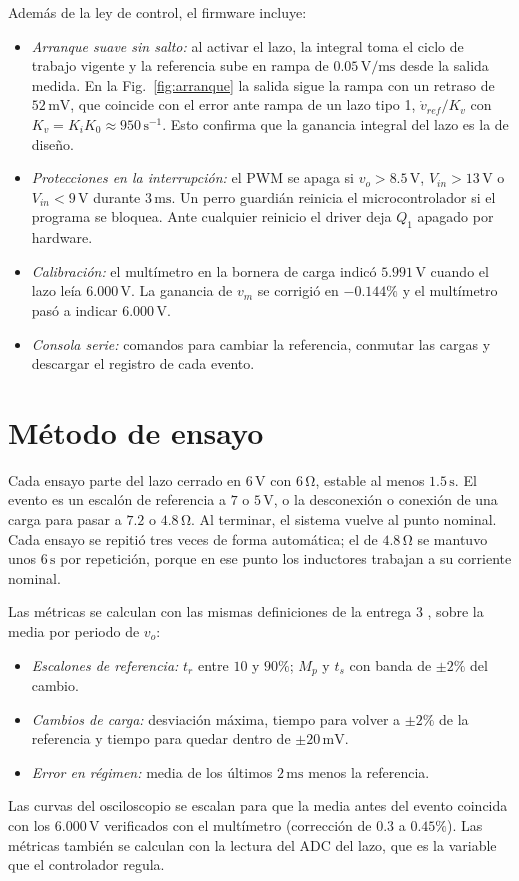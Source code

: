 \documentclass[conference,letterpaper]{IEEEtran}
\newcommand{\unit}[1]{\,\mathrm{#1}}
\begin{document}
Además de la ley de control, el firmware incluye:
\begin{itemize}
\item \emph{Arranque suave sin salto:} al activar el lazo, la integral toma el ciclo de trabajo vigente y la referencia sube en rampa de $0.05\unit{V/ms}$ desde la salida medida. En la Fig.~\ref{fig:arranque} la salida sigue la rampa con un retraso de $52\unit{mV}$, que coincide con el error ante rampa de un lazo tipo 1, $\dot v_{ref}/K_v$ con $K_v=K_iK_0\approx950\unit{s^{-1}}$. Esto confirma que la ganancia integral del lazo es la de diseño.
\item \emph{Protecciones en la interrupción:} el PWM se apaga si $v_o>8.5\unit{V}$, $V_{in}>13\unit{V}$ o $V_{in}<9\unit{V}$ durante $3\unit{ms}$. Un perro guardián reinicia el microcontrolador si el programa se bloquea. Ante cualquier reinicio el driver deja $Q_1$ apagado por hardware.
\item \emph{Calibración:} el multímetro en la bornera de carga indicó $5.991\unit{V}$ cuando el lazo leía $6.000\unit{V}$. La ganancia de $v_m$ se corrigió en $-0.144\%$ y el multímetro pasó a indicar $6.000\unit{V}$.
\item \emph{Consola serie:} comandos para cambiar la referencia, conmutar las cargas y descargar el registro de cada evento.
\end{itemize}

\section{Método de ensayo}\label{sec:metodo}
Cada ensayo parte del lazo cerrado en $6\unit{V}$ con $6\unit{\Omega}$, estable al menos $1.5\unit{s}$. El evento es un escalón de referencia a $7$ o $5\unit{V}$, o la desconexión o conexión de una carga para pasar a $7.2$ o $4.8\unit{\Omega}$. Al terminar, el sistema vuelve al punto nominal. Cada ensayo se repitió tres veces de forma automática; el de $4.8\unit{\Omega}$ se mantuvo unos $6\unit{s}$ por repetición, porque en ese punto los inductores trabajan a su corriente nominal.

Las métricas se calculan con las mismas definiciones de la entrega 3 \cite{e3}, sobre la media por periodo de $v_o$:
\begin{itemize}
\item \emph{Escalones de referencia:} $t_r$ entre $10$ y $90\%$; $M_p$ y $t_s$ con banda de $\pm2\%$ del cambio.
\item \emph{Cambios de carga:} desviación máxima, tiempo para volver a $\pm2\%$ de la referencia y tiempo para quedar dentro de $\pm20\unit{mV}$.
\item \emph{Error en régimen:} media de los últimos $2\unit{ms}$ menos la referencia.
\end{itemize}
Las curvas del osciloscopio se escalan para que la media antes del evento coincida con los $6.000\unit{V}$ verificados con el multímetro (corrección de $0.3$ a $0.45\%$). Las métricas también se calculan con la lectura del ADC del lazo, que es la variable que el controlador regula.
\end{document}
